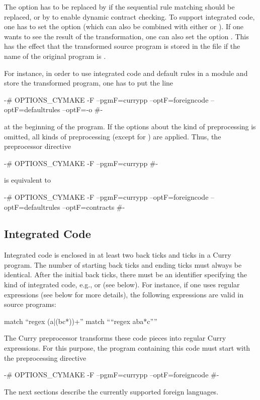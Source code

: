 The option  has to be replaced by
 if the sequential rule matching should be replaced,
or by  to enable dynamic contract checking.
To support integrated code, one has to set the option
 (which can also be combined with
either  or ).
If one wants to see the result of the transformation, one can
also set the option . This has the effect that the
transformed source program is stored in the file
 if the name of the original program
is .

For instance, in order to use integrated code and default rules
in a module and store the transformed program,
one has to put the line
\begin{curry}
{-# OPTIONS_CYMAKE -F --pgmF=currypp --optF=foreigncode --optF=defaultrules --optF=-o #-}
\end{curry}
at the beginning of the program.
%
If the options about the kind of preprocessing is omitted,
all kinds of preprocessing (except for )
are applied. Thus, the preprocessor directive
\begin{curry}
{-# OPTIONS_CYMAKE -F --pgmF=currypp #-}
\end{curry}
is equivalent to
\begin{curry}
{-# OPTIONS_CYMAKE -F --pgmF=currypp --optF=foreigncode --optF=defaultrules --optF=contracts #-}
\end{curry}


\subsection{Integrated Code}

Integrated code is enclosed in at least two back ticks and ticks
in a Curry program. The number of starting back ticks and ending ticks
must always be identical.
After the initial back ticks, there must be an identifier
specifying the kind of integrated code,
e.g.,  or  (see below).
For instance, if one uses regular expressions (see below for more details),
the following expressions are valid in source programs:
\begin{curry}
  match ``regex (a|(bc*))+''
  match ````regex aba*c''''
\end{curry}
The Curry preprocessor transforms these code pieces into regular
Curry expressions.
For this purpose, the program containing this code must start with
the preprocessing directive
\begin{curry}
{-# OPTIONS_CYMAKE -F --pgmF=currypp --optF=foreigncode #-}
\end{curry}
%
The next sections describe the currently supported foreign languages.


